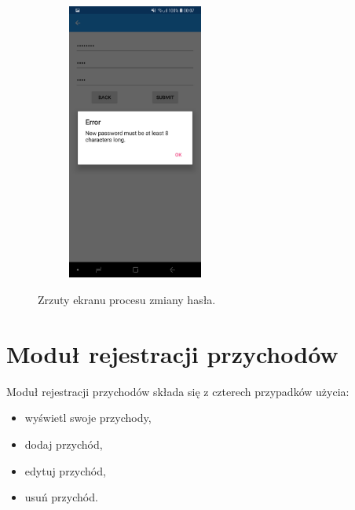 \begin{figure}[!ht]
\begin{center}
\begin{subfigure}[b]{0.3\textwidth}
			\label{haslo}
		\end{subfigure}
		\begin{subfigure}[b]{0.3\textwidth}
			\includegraphics[width=1.75in]{img/mobile/haslo_blad.jpg}
			\label{haslo_blad}
		\end{subfigure}
	\end{center}
	\caption{Zrzuty ekranu procesu zmiany hasła.}
\end{figure}
\section{Moduł rejestracji przychodów}
Moduł rejestracji przychodów składa się z czterech przypadków użycia:
\begin{itemize}
\item wyświetl swoje przychody,
\item dodaj przychód,
\item edytuj przychód,
\item usuń przychód.
\end{itemize}

